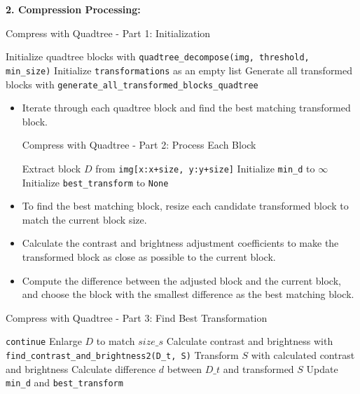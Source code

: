 \documentclass[a4paper,11pt, titlepage]{article}
\theoremstyle{definition}
\theoremstyle{plain}
\theoremstyle{remark}
\theoremstyle{definition}
\begin{document}
\newpage


\textbf{2. Compression Processing:}
\begin{algorithm}
\caption{Compress with Quadtree - Part 1: Initialization}
\begin{algorithmic}[1]
\STATE Initialize quadtree blocks with \texttt{quadtree\_decompose(img, threshold, min\_size)}
\STATE Initialize \texttt{transformations} as an empty list
\STATE Generate all transformed blocks with \texttt{generate\_all\_transformed\_blocks\_quadtree}
\end{algorithmic}
\end{algorithm}
\begin{itemize}
    \item Iterate through each quadtree block and find the best matching transformed block.

\begin{algorithm}
\caption{Compress with Quadtree - Part 2: Process Each Block}
\begin{algorithmic}[1]
    \STATE Extract block $D$ from \texttt{img[x:x+size, y:y+size]}
    \STATE Initialize \texttt{min\_d} to $\infty$
    \STATE Initialize \texttt{best\_transform} to \texttt{None}
\ENDFOR
\end{algorithmic}
\end{algorithm}

    \item To find the best matching block, resize each candidate transformed block to match the current block size.


    \item Calculate the contrast and brightness adjustment coefficients to make the transformed block as close as possible to the current block.
    \item Compute the difference between the adjusted block and the current block, and choose the block with the smallest difference as the best matching block.
\end{itemize}
\begin{algorithm}
\caption{Compress with Quadtree - Part 3: Find Best Transformation}
\begin{algorithmic}[1]
            \STATE \texttt{continue}
        \ELSE
            \STATE Enlarge $D$ to match $size\_s$
        \ENDIF
        \STATE Calculate contrast and brightness with \texttt{find\_contrast\_and\_brightness2(D\_t, S)}
        \STATE Transform $S$ with calculated contrast and brightness
        \STATE Calculate difference $d$ between $D\_t$ and transformed $S$
            \STATE Update \texttt{min\_d} and \texttt{best\_transform}
        \ENDIF
    \ENDFOR
\end{algorithmic}
\end{algorithm}
\end{document}
